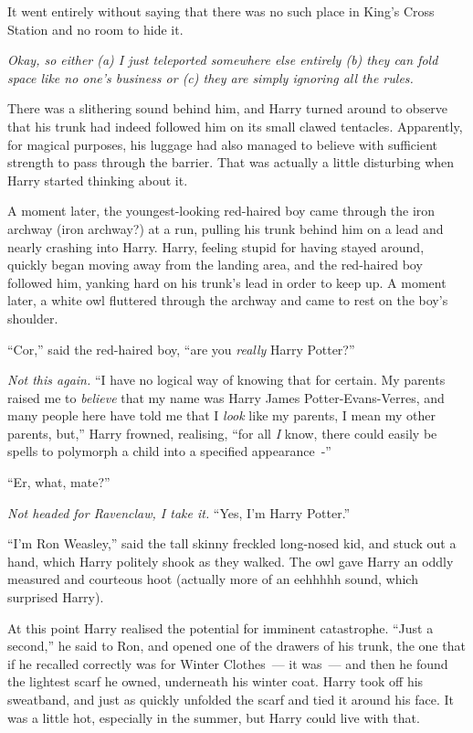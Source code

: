 It went entirely without saying that there was no such place in King's Cross Station and no room to hide it.

\emph{Okay, so either (a) I just teleported somewhere else entirely (b) they can fold space like no one's business or (c) they are simply ignoring all the rules.}

There was a slithering sound behind him, and Harry turned around to observe that his trunk had indeed followed him on its small clawed tentacles. Apparently, for magical purposes, his luggage had also managed to believe with sufficient strength to pass through the barrier. That was actually a little disturbing when Harry started thinking about it.

A moment later, the youngest-looking red-haired boy came through the iron archway (iron archway?) at a run, pulling his trunk behind him on a lead and nearly crashing into Harry. Harry, feeling stupid for having stayed around, quickly began moving away from the landing area, and the red-haired boy followed him, yanking hard on his trunk's lead in order to keep up. A moment later, a white owl fluttered through the archway and came to rest on the boy's shoulder.

``Cor,'' said the red-haired boy, ``are you \emph{really} Harry Potter?''

\emph{Not this again.} ``I have no logical way of knowing that for certain. My parents raised me to \emph{believe} that my name was Harry James Potter-Evans-Verres, and many people here have told me that I \emph{look} like my parents, I mean my other parents, but,'' Harry frowned, realising, ``for all \emph{I} know, there could easily be spells to polymorph a child into a specified appearance~-''

``Er, what, mate?''

\emph{Not headed for Ravenclaw, I take it.} ``Yes, I'm Harry Potter.''

``I'm Ron Weasley,'' said the tall skinny freckled long-nosed kid, and stuck out a hand, which Harry politely shook as they walked. The owl gave Harry an oddly measured and courteous hoot (actually more of an eehhhhh sound, which surprised Harry).

At this point Harry realised the potential for imminent catastrophe. ``Just a second,'' he said to Ron, and opened one of the drawers of his trunk, the one that if he recalled correctly was for Winter Clothes~--- it was~--- and then he found the lightest scarf he owned, underneath his winter coat. Harry took off his sweatband, and just as quickly unfolded the scarf and tied it around his face. It was a little hot, especially in the summer, but Harry could live with that.

